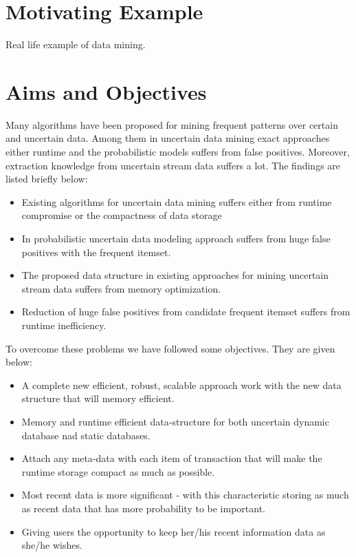 \section{Motivating Example}
Real life example of data mining.


\section{Aims and Objectives}
Many algorithms have been proposed for mining frequent patterns over certain and uncertain data. Among them in uncertain data mining exact approaches either runtime and the probabilistic models suffers from false positives. Moreover, extraction knowledge from uncertain stream data suffers a lot. The findings are listed briefly below:
\begin{itemize}
    \item Existing algorithms for uncertain data mining suffers either from runtime compromise or the compactness of data storage
    \item In probabilistic uncertain data modeling approach suffers from huge false positives with the frequent itemset.
    \item The proposed data structure in existing approaches for mining uncertain stream data suffers from memory optimization.
    \item Reduction of huge false positives from candidate frequent itemset suffers from runtime inefficiency.
\end{itemize}
To overcome these problems we have followed some objectives. They are given below:
\begin{itemize}
    \item A complete new efficient, robust, scalable approach work with the new data structure that will memory efficient.
    \item Memory and runtime efficient data-structure for both uncertain dynamic database nad static databases.
    \item Attach any meta-data with each item of transaction that will make the runtime storage compact as much as possible.
    \item Most recent data is more significant - with this characteristic storing as much as recent data that has more probability to be important.
    \item Giving users the opportunity to keep her/his recent information data as she/he wishes.

\end{itemize}


